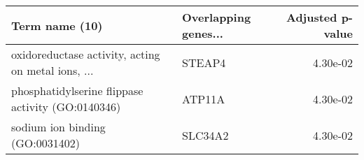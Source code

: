 \begin{tabular}{llr}
\toprule
                                    Term name (10) & Overlapping genes... &  Adjusted p-value \\
\midrule
oxidoreductase activity, acting on metal ions, ... &               STEAP4 &          4.30e-02 \\
 phosphatidylserine flippase activity (GO:0140346) &               ATP11A &          4.30e-02 \\
                   sodium ion binding (GO:0031402) &              SLC34A2 &          4.30e-02 \\
\bottomrule
\end{tabular}
